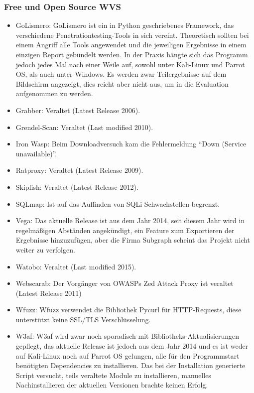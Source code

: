 \documentclass[12pt,oneside,a4paper,parskip]{scrbook}
\begin{document}
    \subsubsection{Free und Open Source WVS}
    \begin{itemize}
      \item GoLismero: GoLismero ist ein in Python geschriebenes Framework, das verschiedene Penetrationtesting-Tools in sich vereint. Theoretisch sollten bei einem Angriff alle Tools angewendet und die jeweiligen Ergebnisse in einem einzigen Report gebündelt werden. In der Praxis hängte sich das Programm jedoch jedes Mal nach einer Weile auf, sowohl unter Kali-Linux und Parrot OS, als auch unter Windows. Es werden zwar Teilergebnisse auf dem Bildschirm angezeigt, dies reicht aber nicht aus, um in die Evaluation aufgenommen zu werden.
      \item Grabber: Veraltet (Latest Release 2006).
      \item Grendel-Scan: Veraltet (Last modified 2010).
      \item Iron Wasp: Beim Downloadversuch kam die Fehlermeldung ``Down (Service unavailable)''.
      \item Ratproxy: Veraltet (Latest Release 2009).
      \item Skipfish: Veraltet (Latest Release 2012).
      \item SQLmap: Ist auf das Auffinden von SQLi Schwachstellen begrenzt.
      \item Vega: Das aktuelle Release ist aus dem Jahr 2014, seit diesem Jahr wird in regelmäßigen Abständen angekündigt, ein Feature zum Exportieren der Ergebnisse hinzuzufügen, aber die Firma Subgraph scheint das Projekt nicht weiter zu verfolgen.
      \item Watobo: Veraltet (Last modified 2015).
      \item Webscarab: Der Vorgänger von OWASPs Zed Attack Proxy ist veraltet (Latest Release 2011)
      \item Wfuzz: Wfuzz verwendet die Bibliothek Pycurl für HTTP-Requests, diese unterstützt keine SSL/TLS Verschlüsselung.
      \item W3af: W3af wird zwar noch sporadisch mit Bibliotheks-Aktualisierungen gepflegt, das aktuelle Release ist jedoch aus dem Jahr 2014 und es ist weder auf Kali-Linux noch auf Parrot OS gelungen, alle für den Programmstart benötigten Dependencies zu installieren. Das bei der Installation generierte Script versucht, teils veraltete Module zu installieren, manuelles Nachinstallieren der aktuellen Versionen brachte keinen Erfolg.

\end{itemize}
\end{document}

